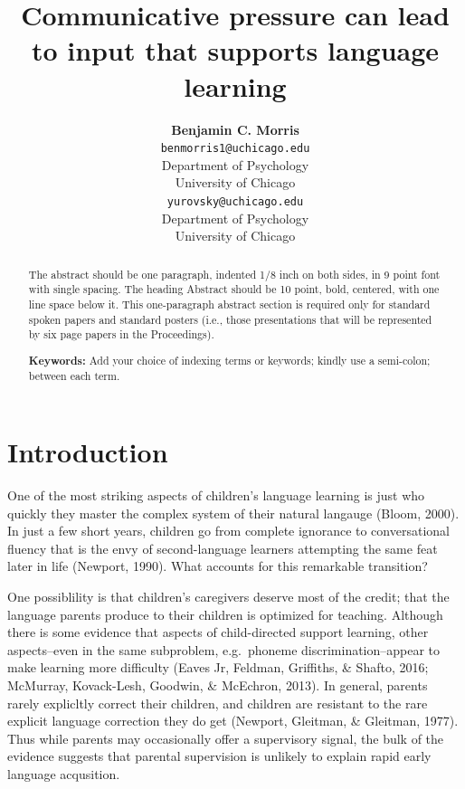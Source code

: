 \documentclass[10pt, letterpaper]{article}
\title{Communicative pressure can lead to input that supports language learning}
\author{{\large \bf Benjamin C. Morris} \\ \texttt{benmorris1@uchicago.edu} \\ Department of Psychology \\ University of Chicago \And {\large \bf Daniel Yurovsky} \\ \texttt{yurovsky@uchicago.edu} \\ Department of Psychology \\ University of Chicago}
\begin{document}
\maketitle

\begin{abstract}
The abstract should be one paragraph, indented 1/8 inch on both sides,
in 9 point font with single spacing. The heading Abstract should be 10
point, bold, centered, with one line space below it. This one-paragraph
abstract section is required only for standard spoken papers and
standard posters (i.e., those presentations that will be represented by
six page papers in the Proceedings).

\textbf{Keywords:}
Add your choice of indexing terms or keywords; kindly use a semi-colon;
between each term.
\end{abstract}

\section{Introduction}\label{introduction}

One of the most striking aspects of children's language learning is just
who quickly they master the complex system of their natural langauge
(Bloom, 2000). In just a few short years, children go from complete
ignorance to conversational fluency that is the envy of second-language
learners attempting the same feat later in life (Newport, 1990). What
accounts for this remarkable transition?

One possiblility is that children's caregivers deserve most of the
credit; that the language parents produce to their children is optimized
for teaching. Although there is some evidence that aspects of
child-directed support learning, other aspects--even in the same
subproblem, e.g.~phoneme discrimination--appear to make learning more
difficulty (Eaves Jr, Feldman, Griffiths, \& Shafto, 2016; McMurray,
Kovack-Lesh, Goodwin, \& McEchron, 2013). In general, parents rarely
explicltly correct their children, and children are resistant to the
rare explicit language correction they do get (Newport, Gleitman, \&
Gleitman, 1977). Thus while parents may occasionally offer a supervisory
signal, the bulk of the evidence suggests that parental supervision is
unlikely to explain rapid early language acqusition.
\end{document}
